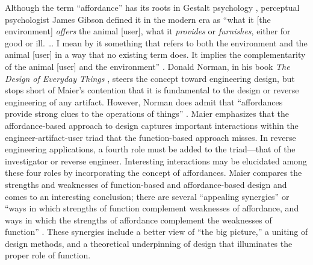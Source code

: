 Although the term “affordance” has its roots in Gestalt
psychology \citep{koffka1935}, perceptual psychologist James Gibson
defined it in the modern era as “what it [the environment]
\textit{offers} the animal [user], what it \textit{provides} or
\textit{furnishes}, either for good or ill. {\ldots} I mean by it something that
refers to both the environment and the animal [user] in a way that no
existing term does. It implies the complementarity of the animal [user]
and the environment” \citep[][p.~127]{gibson1979}. Donald Norman, in his book
\textit{The Design of Everyday Things} \citep{norman1988}, steers the
concept toward engineering design, but stops short of Maier’s
contention that it is fundamental to the design or reverse engineering
of any artifact. However, Norman does admit that ``affordances provide
strong clues to the operations of things'' \citep[][p.~9]{norman1988}. Maier emphasizes that the
affordance-based approach to design captures important interactions
within the engineer-artifact-user triad that the function-based
approach misses. In reverse engineering applications, a fourth role
must be added to the triad---that of the investigator or reverse
engineer. Interesting interactions may be elucidated among these four
roles by incorporating the concept of affordances. Maier compares the
strengths and weaknesses of function-based and affordance-based design
and comes to an interesting conclusion; there are several “appealing
synergies” or ``ways in which strengths of function complement
weaknesses of affordance, and ways in which the strengths of affordance
complement the weaknesses of function'' \citep{maierfadel2002}. These %
synergies include a better view of “the big picture,” a uniting of
design methods, and a theoretical underpinning of design that
illuminates the proper role of function.

